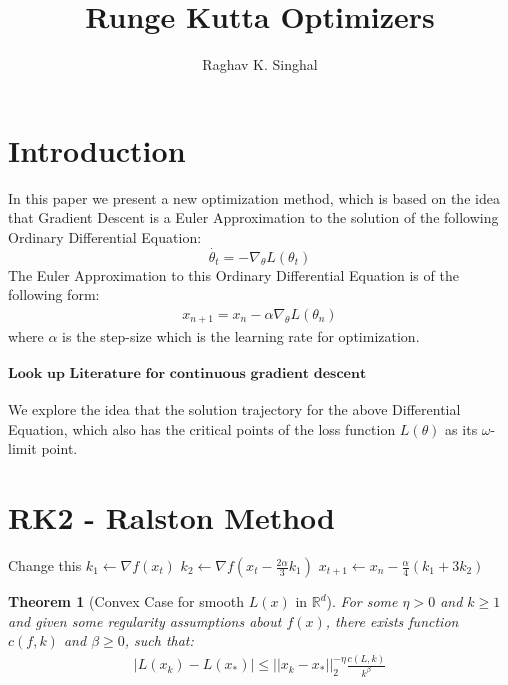 \documentclass[12pt,twoside]{article}
\date{}   %
\newtheorem{thm}{Theorem}
\begin{document}
\title{Runge Kutta Optimizers}

\author{Raghav K. Singhal}

\maketitle

\section{Introduction}
In this paper we present a new optimization method, which is based on the idea that Gradient Descent is a Euler Approximation to the solution of the following Ordinary Differential Equation:
\begin{equation*}
\dot{\theta_t} = -\nabla_{\theta}L(\theta_t)
\end{equation*}
The Euler Approximation to this Ordinary Differential Equation is of the following form:
\begin{align*}
x_{n+1} =  x_n - \alpha \nabla_{\theta}L(\theta_n)
\end{align*}
where $\alpha$ is the step-size which is the learning rate for optimization. 
\\
\\
$\textbf{Look up Literature for continuous gradient descent}$
\\
\\
We explore the idea that the solution trajectory for the above Differential Equation, which also has the critical points of the loss function $L(\theta)$ as its $\omega$-limit point. 
\section{RK2 - Ralston Method}

\begin{algorithmic} [ vsdv  ]
\STATE Change this 
	\STATE $k_1 \gets \nabla f(x_t)$
	\STATE $k_2 \gets \nabla f(x_t - \frac{2\alpha}{3} k_1) $
	\STATE $x_{t+1} \gets x_n - \frac{\alpha}{4}(k_1 + 3 k_2)$
\ENDFOR 
\end{algorithmic}

\begin{thm}[Convex Case for smooth $L(x)$ in $\mathbb{R}^d$]
For some $\eta > 0$ and $k \geq 1$ and given some regularity assumptions
about $f(x)$, there exists function $c(f,k)$ and $\beta \geq 0$, such that:
\begin{align*}
|L(x_k) - L(x_*)| \leq ||x_k - x_*||_{2}^{-\eta} \frac{c(L,k)}{k^{\beta}}
\end{align*}
\end{thm}
\end{document}
